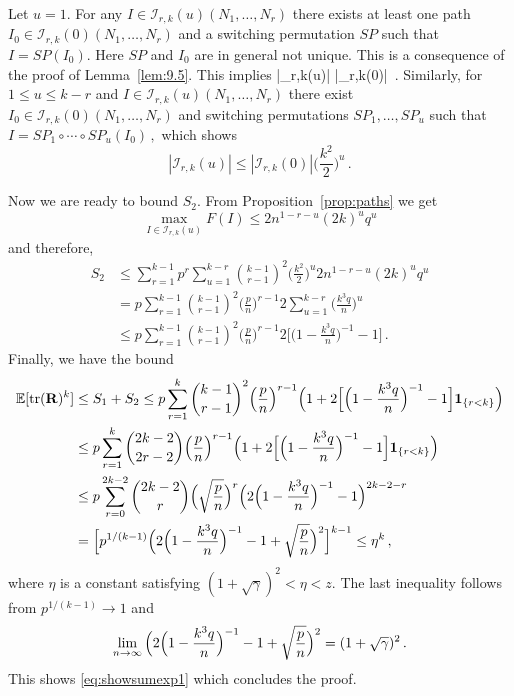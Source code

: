 Let $u=1$. For any $I\in \mathcal{I}_{r,k}(u)(N_1, \ldots, N_r)$ there exists at least one path $I_0 \in \mathcal{I}_{r,k}(0)(N_1, \ldots, N_r)$ and a switching permutation $SP$ such that $I= SP(I_0)$. Here $SP$ and $I_0$ are in general not unique. This is a consequence of the proof of Lemma~\ref{lem:9.5}. This implies
\beao
|_{r,k}(u)| \le |_{r,k}(0)| \,.
\eeao
Similarly, for $1\le u\le k-r$ and $I\in \mathcal{I}_{r,k}(u)(N_1, \ldots, N_r)$ there exist $I_0 \in \mathcal{I}_{r,k}(0)(N_1, \ldots, N_r)$ and switching permutations $SP_1,\ldots, SP_u$ such that
$
I= SP_1 \circ \cdots \circ SP_u (I_0)\,,
$
which shows
\begin{equation}\label{eq:lsetseet}
|\mathcal{I}_{r,k}(u)| \le |\mathcal{I}_{r,k}(0)| \Big(\frac{k^2}{2}\Big)^u\,.
\end{equation}
\par
Now we are ready to bound $S_2$. From Proposition~\ref{prop:paths} we get 
\begin{equation*}
\max_{I\in \mathcal{I}_{r,k}(u)}F(I) \le 2 n^{1-r-u}(2k)^u q^u 
\end{equation*}
and therefore,
\begin{equation*}
\begin{split}
S_2&\le \sum_{r=1}^{k-1} p^r \sum_{u=1}^{k-r} \binom{k-1}{r-1}^2 \Big(\frac{k^2}{2}\Big)^u 2 n^{1-r-u}(2k)^u q^u\\
&= p \sum_{r=1}^{k-1} \binom{k-1}{r-1}^2 \Big(\frac{p}{n}\Big)^{r-1} 2 \sum_{u=1}^{k-r} \Big( \frac{k^3 q}{n} \Big)^u\\
&\le p \sum_{r=1}^{k-1} \binom{k-1}{r-1}^2 \Big(\frac{p}{n}\Big)^{r-1} 2 \Big[\Big(1- \frac{k^3 q}{n} \Big)^{-1}-1\Big]\,.
\end{split}
\end{equation*}
Finally, we have the bound
\begin{equation*}
\begin{split}
\mathbb{E}[\operatorname{tr}({\mathbf R})^k]&\le S_1+S_2\le p \sum_{r=1}^k \binom{k-1}{r-1}^2 \Big(\frac{p}{n}\Big)^{r-1} \Big( 1+ 2 \Big[\Big(1- \frac{k^3 q}{n} \Big)^{-1}-1\Big] \mathbf{1}_{\{r<k\}} \Big)\\
&\le p \sum_{r=1}^k \binom{2k-2}{2r-2} \Big(\frac{p}{n}\Big)^{r-1} \Big( 1+ 2 \Big[\Big(1- \frac{k^3 q}{n} \Big)^{-1}-1\Big]\mathbf{1}_{\{r<k\}}\Big)\\
&\le p\sum_{r=0}^{2k-2} \binom{2k-2}{r} \Big(\sqrt{\frac{p}{n}}\Big)^{r} \Big( 2 \Big(1- \frac{k^3 q}{n} \Big)^{-1}-1 \Big)^{2k-2-r}\\
&= \Big[p^{1/(k-1)} \Big( 2 \Big(1- \frac{k^3 q}{n} \Big)^{-1}-1 +\sqrt{\frac{p}{n}}\Big)^2\Big]^{k-1} \le \eta^k\,,
\end{split}
\end{equation*}
where $\eta$ is a constant satisfying $(1+\sqrt{\gamma})^2<\eta<z$. The last inequality follows from $p^{1/(k-1)} \to 1$ and
\begin{equation*}
\lim_{n \to \infty} \Big( 2 \Big(1- \frac{k^3 q}{n} \Big)^{-1}-1 +\sqrt{\frac{p}{n}}\Big)^2 =(1+\sqrt{\gamma})^2\,.
\end{equation*}
This shows \eqref{eq:showsumexp1} which concludes the proof.



